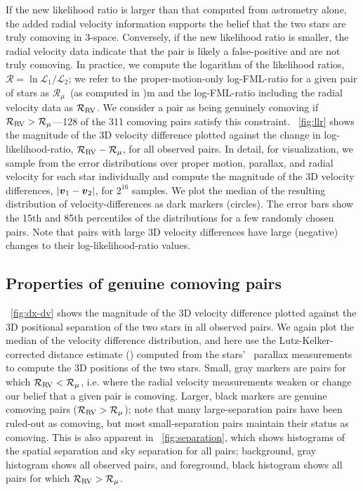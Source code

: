 \documentclass[modern, letterpaper]{aastex61}
\newcommand{\tgas}{\acronym{TGAS}}
\newcommand{\llrold}{\ensuremath{\mathcal{R}_\mu}}
\newcommand{\llrnew}{\ensuremath{\mathcal{R}_{\rm RV}}}
\begin{document}
If the new likelihood ratio is larger than that computed from astrometry alone,
the added radial velocity information supports the belief that the two stars are
truly comoving in 3-space.
Conversely, if the new likelihood ratio is smaller, the radial velocity data
indicate that the pair is likely a false-positive and are not truly comoving.
In practice, we compute the logarithm of the likelihood ratios,
$\mathcal{R} = \ln \mathcal{L}_1/\mathcal{L}_2$; we refer to the
proper-motion-only log-FML-ratio for a given pair of stars as
\llrold\ (as computed in \citealt{Oh:2017})m and the log-FML-ratio including the radial velocity data as \llrnew.
We consider a pair as being genuinely comoving if $\llrnew > \llrold$---128 of
the 311 comoving pairs satisfy this constraint.
\figurename~\ref{fig:llr} shows the magnitude of the 3D velocity difference
plotted against the change in log-likelihood-ratio, $\llrnew - \llrold$, for all
observed pairs.
In detail, for visualization, we sample from the error distributions over proper
motion, parallax, and radial velocity for each star individually and compute the
magnitude of the 3D velocity differences, $|\boldsymbol{v}_1-\boldsymbol{v}_2|$, for $2^{16}$
samples.
We plot the median of the resulting distribution of velocity-differences as
dark markers (circles).
The error bars show the 15th and 85th percentiles of the distributions for a few
randomly chosen pairs.
Note that pairs with large 3D velocity differences have large (negative) changes
to their log-likelihood-ratio values.

\subsection{Properties of genuine comoving pairs}\label{sec:genuine}

\figurename~\ref{fig:dx-dv} shows the magnitude of the 3D velocity difference
plotted against the 3D positional separation of the two stars in all observed
pairs.
We again plot the median of the velocity difference distribution, and here use
the Lutz-Kelker-corrected distance estimate (\citealt{Lutz:1973}) computed from
the stars' \tgas\ parallax measurements to compute the 3D positions of the two
stars.
Small, gray markers are pairs for which $\llrnew < \llrold$, i.e. where the
radial velocity measurements weaken or change our belief that a given pair is
comoving.
Larger, black markers are genuine comoving pairs ($\llrnew > \llrold$); note
that many large-separation pairs have been ruled-out as comoving, but
most small-separation pairs maintain their status as comoving.
This is also apparent in \figurename~\ref{fig:separation}, which shows
histograms of the spatial separation and sky separation for all pairs;
background, gray histogram shows all observed pairs, and foreground, black
histogram shows all pairs for which $\llrnew > \llrold$.
\end{document}

